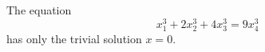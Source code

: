 \begin{proposition}\label{eq:045}
    The equation
\[
    x_1^3+2x_2^3+4x_3^3=9x_4^3
\]
    has only the trivial solution $x=0$.
\end{proposition}
